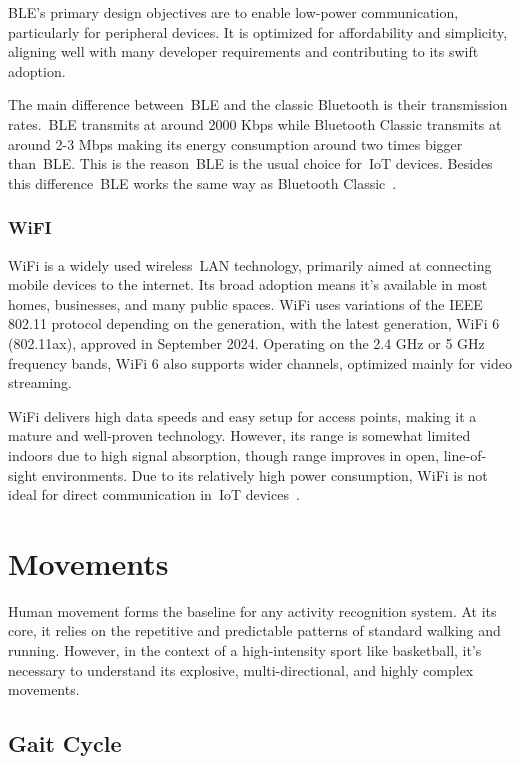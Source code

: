 \gls{BLE}'s primary design objectives are to enable low-power communication, particularly for peripheral devices. It is optimized for affordability and simplicity, aligning well with many 
developer requirements and contributing to its swift adoption.

The main difference between~\gls{BLE} and the classic Bluetooth is their transmission rates.~\gls{BLE} transmits at around 2000 Kbps while Bluetooth Classic transmits at around 2-3 Mbps making its energy consumption 
around two times bigger than~\gls{BLE}. This is the reason~\gls{BLE} is the usual choice for~\gls{IoT} devices. Besides this difference~\gls{BLE} works the same way as Bluetooth Classic~\cite{masterInsole, bachelorInsole}.

\subsubsection{WiFI}
\label{sssec:wifiT}

WiFi is a widely used wireless~\gls{LAN} technology, primarily aimed at connecting mobile devices to the internet. Its broad adoption means it's available in most homes, businesses, and many public 
spaces. WiFi uses variations of the IEEE 802.11 protocol depending on the generation, with the latest generation, WiFi 6 (802.11ax), approved in September 2024. Operating on the 2.4 GHz or 5 GHz 
frequency bands, WiFi 6 also supports wider channels, optimized mainly for video streaming.

WiFi delivers high data speeds and easy setup for access points, making it a mature and well-proven technology. However, its range is somewhat limited indoors due to high signal 
absorption, though range improves in open, line-of-sight environments. Due to its relatively high power consumption, WiFi is not ideal for direct communication in~\gls{IoT} devices~\cite{masterInsole, bachelorInsole}.


\section{Movements}
\label{sec:movements}

Human movement forms the baseline for any activity recognition system. At its core, it relies on the repetitive and predictable patterns of 
standard walking and running. However, in the context of a high-intensity sport like basketball, it's necessary to understand its explosive, 
multi-directional, and highly complex movements.

\subsection{Gait Cycle}
\label{ssec:gait_cycleT}

